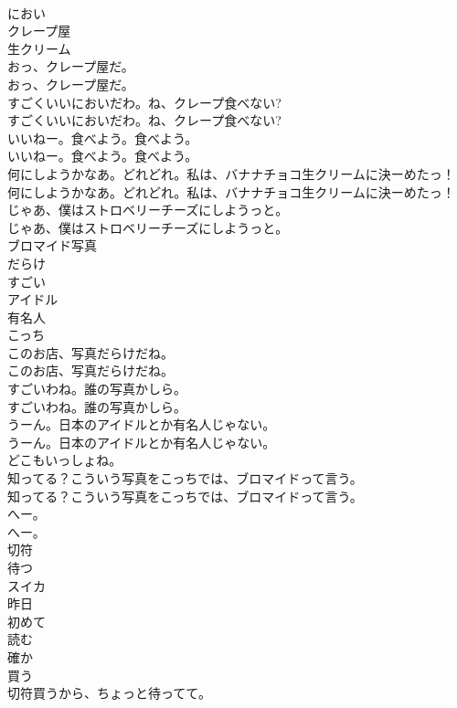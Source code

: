 \documentclass[8pt]{extreport}
\begin{document}
\begin{CJK}{UTF8}{min}
\\	におい
\\	クレープ屋
\\	生クリーム
\\	おっ、クレープ屋だ。	
\\	おっ、クレープ屋だ。 
\\	すごくいいにおいだわ。ね、クレープ食べない?	
\\	すごくいいにおいだわ。ね、クレープ食べない? 
\\	いいねー。食べよう。食べよう。	
\\	いいねー。食べよう。食べよう。 
\\	何にしようかなあ。どれどれ。私は、バナナチョコ生クリームに決ーめたっ！	
\\	何にしようかなあ。どれどれ。私は、バナナチョコ生クリームに決ーめたっ！ 
\\	じゃあ、僕はストロベリーチーズにしようっと。	
\\	じゃあ、僕はストロベリーチーズにしようっと。 
\\	ブロマイド写真
\\	だらけ
\\	すごい
\\	アイドル
\\	有名人
\\	こっち
\\	このお店、写真だらけだね。	
\\	このお店、写真だらけだね。 
\\	すごいわね。誰の写真かしら。	
\\	すごいわね。誰の写真かしら。 
\\	うーん。日本のアイドルとか有名人じゃない。	
\\	うーん。日本のアイドルとか有名人じゃない。 
\\	どこもいっしょね。	
\\	知ってる？こういう写真をこっちでは、ブロマイドって言う。	
\\	知ってる？こういう写真をこっちでは、ブロマイドって言う。 
\\	へー。	
\\	へー。 
\\	切符
\\	待つ
\\	スイカ
\\	昨日
\\	初めて
\\	読む
\\	確か
\\	買う
\\	切符買うから、ちょっと待ってて。	

\end{CJK}
\end{document}
